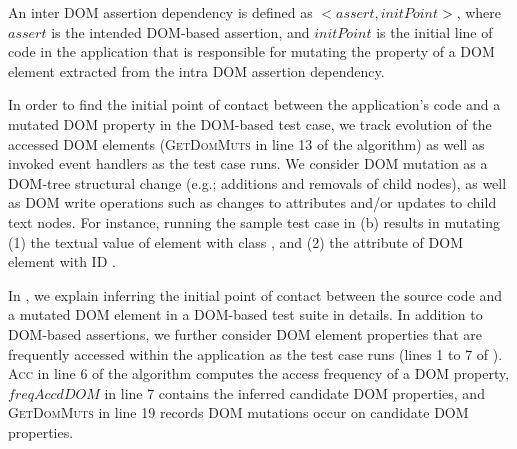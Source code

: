 \begin{mydef}
\label{def:interDOMDep} 
An inter DOM assertion dependency is defined as $<assert, initPoint>$, where $assert$ is the intended DOM-based assertion, and $initPoint$ is the initial line of code in the application that is responsible for mutating the property of a DOM element extracted from the intra DOM assertion dependency.
\end{mydef}
In order to find the initial point of contact between the application's code and a mutated DOM property in the DOM-based test case, we track evolution of the accessed DOM elements (\textsc{GetDomMuts} in line 13 of the algorithm) as well as invoked event handlers as the test case runs. 
We consider DOM mutation as a DOM-tree structural change (e.g.; additions and removals of child nodes), as well as DOM write operations such as changes to attributes and/or updates to child text nodes. For instance, running the sample test case in (b) results in mutating (1) the textual value of  element with class , and (2) the  attribute of DOM element with ID .

In , we explain inferring the initial point of contact between the source code and a mutated DOM element in a DOM-based test suite in details.  
In addition to DOM-based assertions, we further consider DOM element properties that are frequently accessed within the application as the test case runs (lines 1 to 7 of ). 
\textsc{Acc} in line 6 of the algorithm computes the access frequency of a DOM property, $freqAccdDOM$ in line 7 contains the inferred candidate DOM properties, and \textsc{GetDomMuts} in line 19 records DOM mutations occur
on candidate DOM properties.

